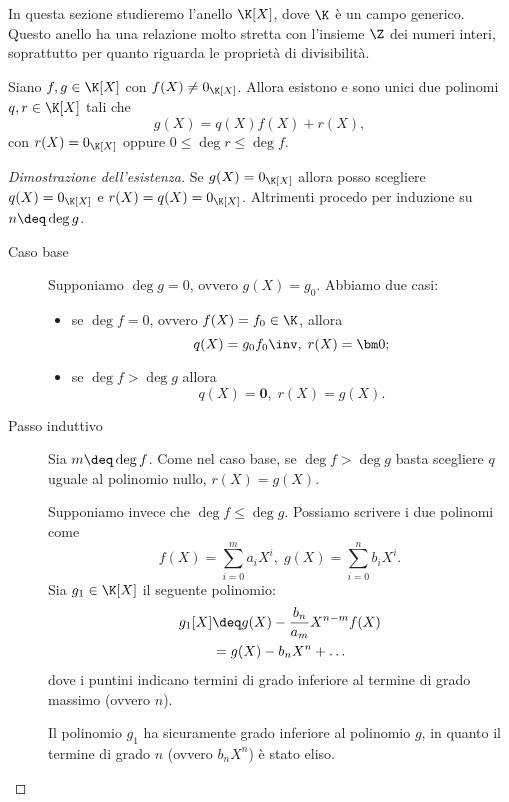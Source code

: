 In questa sezione studieremo l'anello $\K[X]$, dove $\K$ è un campo generico. Questo anello ha una relazione molto stretta con l'insieme $\Z$ dei numeri interi, soprattutto per quanto riguarda le proprietà di divisibilità.

\begin{theorem}
    \label{th:divisione_euclidea_KX}
    Siano $f, g \in \K[X]$ con $f(X) \neq 0_{\K[X]}$. Allora esistono e sono unici due polinomi $q, r \in \K[X]$ tali che \[
        g(X) = q(X)f(X) + r(X),
    \] con $r(X) = 0_{\K[X]}$ oppure $0 \leq \deg r \leq \deg f$.
\end{theorem}
\begin{proof}[Dimostrazione dell'esistenza]
    Se $g(X) = 0_{\K[X]}$ allora posso scegliere $q(X) = 0_{\K[X]}$ e $r(X) = q(X) = 0_{\K[X]}$.
    Altrimenti procedo per induzione su $n \deq \deg g$.
    \begin{description}
        \item[Caso base] Supponiamo $\deg g = 0$, ovvero $g(X) = g_0$. Abbiamo due casi: \begin{itemize}
            \item se $\deg f = 0$, ovvero $f(X) = f_0 \in \K$, allora \[
                q(X) = g_0{f_0}\inv, \; r(X) = \bm 0;
            \]
            \item se $\deg f > \deg g$ allora \[
                q(X) = \bm 0, \; r(X) = g(X).    
            \]
        \end{itemize}
        \item[Passo induttivo] Sia $m \deq \deg f$. Come nel caso base, se $\deg f > \deg g$ basta scegliere $q$ uguale al polinomio nullo, $r(X) = g(X)$.
        
        Supponiamo invece che $\deg f \leq \deg g$. Possiamo scrivere i due polinomi come \[
            f(X) = \sum_{i = 0}^m a_iX^i, \; g(X) = \sum_{i = 0}^n b_iX^i.    
        \]
        Sia $g_1 \in \K[X]$ il seguente polinomio: \begin{align*}
            g_1[X] &\deq g(X) - \frac{b_n}{a_m}X^{n-m}f(X)\\  
            &= g(X) - b_nX^n + \dots 
        \end{align*}
        dove i puntini indicano termini di grado inferiore al termine di grado massimo (ovvero $n$).

        Il polinomio $g_1$ ha sicuramente grado inferiore al polinomio $g$, in quanto il termine di grado $n$ (ovvero $b_nX^n$) è stato eliso.


\end{description}
\end{proof}
